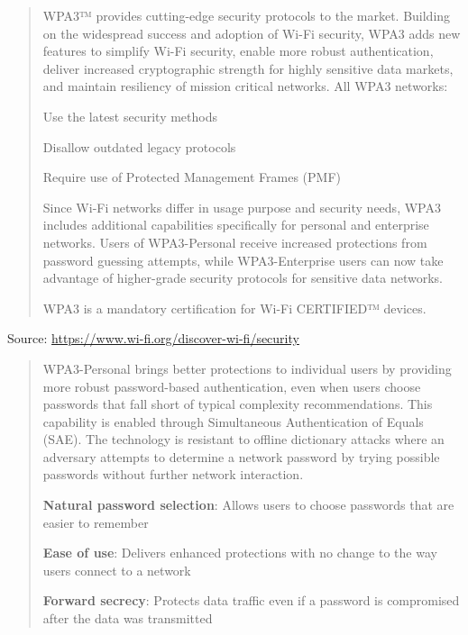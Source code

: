 \documentclass[Screen16to9,17pt]{foils}
\begin{document}
\begin{quote}

WPA3™ provides cutting-edge security protocols to the market. Building on the widespread success and adoption of Wi-Fi security, WPA3 adds new features to simplify Wi-Fi security, enable more robust authentication, deliver increased cryptographic strength for highly sensitive data markets, and maintain resiliency of mission critical networks. All WPA3 networks:

\begin{list2}
\item Use the latest security methods
\item Disallow outdated legacy protocols
\item Require use of Protected Management Frames (PMF)
\end{list2}
Since Wi-Fi networks differ in usage purpose and security needs, WPA3 includes additional capabilities specifically for personal and enterprise networks. Users of WPA3-Personal receive increased protections from password guessing attempts, while WPA3-Enterprise users can now take advantage of higher-grade security protocols for sensitive data networks.

WPA3 is a mandatory certification for Wi-Fi CERTIFIED™ devices.
\end{quote}
Source: \url{https://www.wi-fi.org/discover-wi-fi/security}


\begin{quote}
WPA3-Personal brings better protections to individual users by providing more robust password-based authentication, even when users choose passwords that fall short of typical complexity recommendations. This capability is enabled through Simultaneous Authentication of Equals (SAE). The technology is resistant to offline dictionary attacks where an adversary attempts to determine a network password by trying possible passwords without further network interaction.

\begin{list2}
\item {\bf Natural password selection}: Allows users to choose passwords that are easier to remember
\item {\bf Ease of use}: Delivers enhanced protections with no change to the way users connect to a network
\item {\bf Forward secrecy}: Protects data traffic even if a password is compromised after the data was transmitted
\end{list2}
\end{quote}
\end{document}

